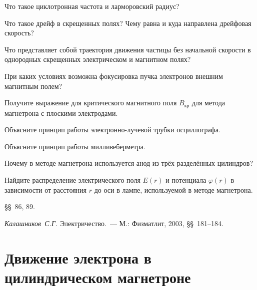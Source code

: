 \begin{lab:questions}
\item Что такое циклотронная частота и ларморовский радиус?
\item Что такое дрейф в скрещенных полях? Чему равна и куда направлена дрейфовая скорость?
\item Что представляет собой траектория движения частицы без начальной скорости 
в однородных скрещенных электрическом и магнитном полях?
\item При каких условиях возможна фокусировка пучка электронов внешним 
магнитным полем?
\item Получите выражение для критического магнитного поля $B_{кр}$ для метода магнетрона
с плоскими электродами.
\item Объясните принцип работы электронно-лучевой трубки осциллографа.
\item Объясните принцип работы милливеберметра.
\item Почему в методе магнетрона используется анод из трёх разделённых цилиндров?
\item Найдите распределение электрического поля $E(r)$ и потенциала $\varphi(r)$ 
в зависимости от расстояния $r$ до оси в лампе, используемой в методе магнетрона.
\end{lab:questions}

\begin{lab:literature}
\item \SivuhinIII \S\S~86, 89.
\item \emph{Калашников~С.Г.} Электричество.~--- М.: Физматлит, 2003,
\S\S~181--184.
\end{lab:literature}


\labsupplement

\section*{Движение электрона в цилиндрическом магнетроне}

